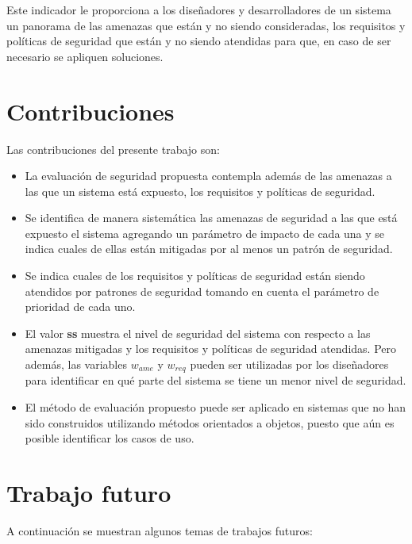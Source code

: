 \vspace{0.3cm}

Este indicador le proporciona a los diseñadores y desarrolladores de un sistema un panorama de las amenazas que están y no siendo consideradas, los requisitos y políticas de seguridad que están y no siendo atendidas para que, en caso de ser necesario se apliquen soluciones. 

\section{Contribuciones}

Las contribuciones del presente trabajo son:

\begin{itemize}
	\item La evaluación de seguridad propuesta contempla además de las amenazas a las que un sistema está expuesto, los requisitos y políticas de seguridad.
	\item Se identifica de manera sistemática las amenazas de seguridad a las que está expuesto el sistema agregando un parámetro de impacto de cada una y se indica cuales de ellas están mitigadas por al menos un patrón de seguridad. 
	\item Se indica cuales de los requisitos y políticas de seguridad están siendo atendidos por patrones de seguridad tomando en cuenta el parámetro de prioridad de cada uno. 
	\item El valor \textbf{ss} muestra el nivel de seguridad del sistema con respecto a las amenazas mitigadas y los requisitos y políticas de seguridad atendidas. Pero además, las variables $w_{ame}$ y $w_{req}$ pueden ser utilizadas por los diseñadores para identificar en qué parte del sistema se tiene un menor nivel de seguridad. 
	\item El método de evaluación propuesto puede ser aplicado en sistemas que no han sido construidos utilizando métodos orientados a objetos, puesto que aún es posible identificar los casos de uso. 
	
\end{itemize}
\section{Trabajo futuro}

A continuación se muestran algunos temas de trabajos futuros:

